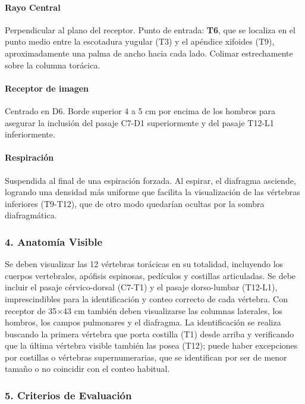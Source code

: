 		\paragraph{Rayo Central}
		Perpendicular al plano del receptor. Punto de entrada: \textbf{T6}, que se localiza en el punto medio entre la escotadura yugular (T3) y el apéndice xifoides (T9), aproximadamente una palma de ancho hacia cada lado. Colimar estrechamente sobre la columna torácica.
		
		\paragraph{Receptor de imagen}
		Centrado en D6. Borde superior 4 a 5 cm por encima de los hombros para asegurar la inclusión del pasaje C7-D1 superiormente y del pasaje T12-L1 inferiormente.
		
		\paragraph{Respiración}
		Suspendida al final de una espiración forzada. Al espirar, el diafragma asciende, logrando una densidad más uniforme que facilita la visualización de las vértebras inferiores (T9-T12), que de otro modo quedarían ocultas por la sombra diafragmática.
		
		\subsubsection*{4. Anatomía Visible}
		
		Se deben visualizar las 12 vértebras torácicas en su totalidad, incluyendo los cuerpos vertebrales, apófisis espinosas, pedículos y costillas articuladas. Se debe incluir el pasaje cérvico-dorsal (C7-T1) y el pasaje dorso-lumbar (T12-L1), imprescindibles para la identificación y conteo correcto de cada vértebra. Con receptor de 35$\times$43 cm también deben visualizarse las columnas laterales, los hombros, los campos pulmonares y el diafragma. La identificación se realiza buscando la primera vértebra que porta costilla (T1) desde arriba y verificando que la última vértebra visible también las posea (T12); puede haber excepciones por costillas o vértebras supernumerarias, que se identifican por ser de menor tamaño o no coincidir con el conteo habitual.
		
		\subsubsection*{5. Criterios de Evaluación}
		
